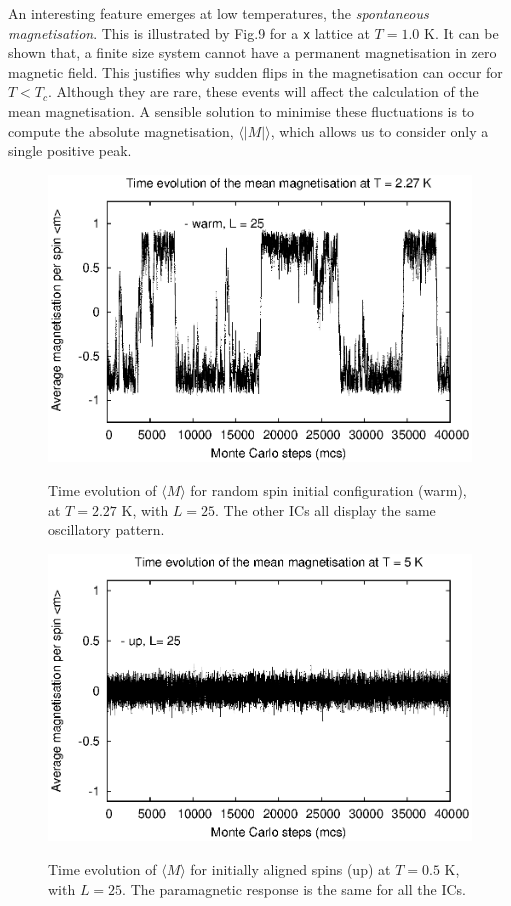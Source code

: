 \documentclass[a4paper]{article}
\begin{document}
\vspace{1cm}

An interesting feature emerges at low temperatures, the \textit{spontaneous magnetisation}. This is illustrated by Fig.9 for a \small \verb;x; \normalsize lattice at $T = 1.0$ K. It can be shown that, a finite size system cannot have a permanent magnetisation in zero magnetic field. This justifies why sudden flips in the magnetisation can occur for $T <T_c$. Although they are rare, these events will affect the calculation of the mean magnetisation. A sensible solution to minimise these fluctuations is to compute the absolute magnetisation, $ \langle |M| \rangle$, which allows us to consider only a single positive peak.


\begin{figure}[h]
\centering
\begin{minipage}[b]{0.45\linewidth}
\includegraphics[width=1\textwidth]{critical.eps}
\label{fig:minipage1}
\caption{Time evolution of $ \langle M \rangle$ for random spin initial configuration (warm), at $T = 2.27$ K, with $L =25$. The other ICs all display the same oscillatory pattern.}
\end{minipage}
\quad
\begin{minipage}[b]{0.45\linewidth}
\includegraphics[width=1\textwidth]{supercritical.eps}
\label{fig:minipage2}
\caption{Time evolution of $ \langle M \rangle$ for initially aligned spins (up) at $T = 0.5$ K, with $L =25$. The paramagnetic response is the same for all the ICs.}
\end{minipage}
\end{figure}
\end{document}
